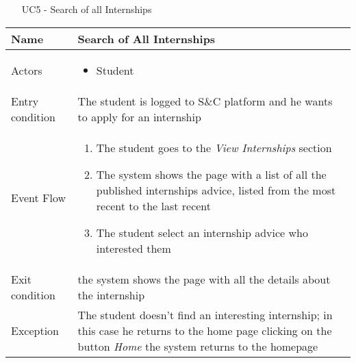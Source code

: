 				\begin{table} [H]
					\centering
					\begin{itemize}
						\item [UC5] - Search of all Internships
					\end{itemize}
					\begin{tabular}{|| P{7.5cm} | P{7.5cm} ||}
						\hline
						Name & Search of All Internships \\
						\hline
						Actors & \parbox{5cm}{\begin{itemize}
								\item Student
							\end{itemize}
						} \\
						\hline
						Entry condition & The student is logged to S\&C platform and he wants to apply for an internship  \\
						\hline
						Event Flow & \parbox{5cm}{\begin{enumerate}[label=\alpha]
								\item The student goes to the \textit{View 
									Internships} section
								\item The system shows the page with a 
								list of all the published internships advice, 
								listed from the most recent to the 
								last recent  
								\item The student select an internship advice who interested them
						\end{enumerate}} \\
						\hline 
						Exit condition &  the system shows the 
						page with all the details about the 
						internship \\
						\hline
						Exception & The student doesn’t find an interesting 
						internship; in this case he returns to the 
						home page clicking on the button \textit{Home}
						the system returns to the homepage 
						 \\
						\hline
					\end{tabular}
				\end{table}
				
				
				
